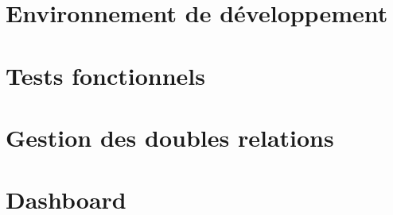 \section{Environnement de développement}
	

\section{Tests fonctionnels}
	
	
\section{Gestion des doubles relations}
	
	
\section{Dashboard}
	